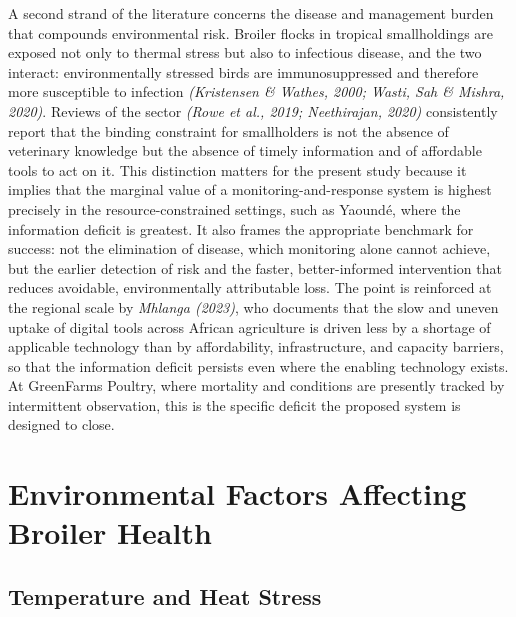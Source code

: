 \documentclass[12pt,a4paper]{report}
\begin{document}
A second strand of the literature concerns the disease and management burden that compounds environmental risk. Broiler flocks in tropical smallholdings are exposed not only to thermal stress but also to infectious disease, and the two interact: environmentally stressed birds are immunosuppressed and therefore more susceptible to infection \textit{(Kristensen \& Wathes, 2000; Wasti, Sah \& Mishra, 2020)}. Reviews of the sector \textit{(Rowe et al., 2019; Neethirajan, 2020)} consistently report that the binding constraint for smallholders is not the absence of veterinary knowledge but the absence of timely information and of affordable tools to act on it. This distinction matters for the present study because it implies that the marginal value of a monitoring-and-response system is highest precisely in the resource-constrained settings, such as Yaound\'e, where the information deficit is greatest. It also frames the appropriate benchmark for success: not the elimination of disease, which monitoring alone cannot achieve, but the earlier detection of risk and the faster, better-informed intervention that reduces avoidable, environmentally attributable loss. The point is reinforced at the regional scale by \textit{Mhlanga (2023)}, who documents that the slow and uneven uptake of digital tools across African agriculture is driven less by a shortage of applicable technology than by affordability, infrastructure, and capacity barriers, so that the information deficit persists even where the enabling technology exists. At GreenFarms Poultry, where mortality and conditions are presently tracked by intermittent observation, this is the specific deficit the proposed system is designed to close.

\section{Environmental Factors Affecting Broiler Health}

\subsection{Temperature and Heat Stress}
\end{document}

